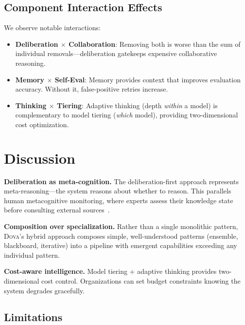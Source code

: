 \documentclass{article}
\theoremstyle{plain}
\theoremstyle{definition}
\newcommand{\dova}{\textsc{Dova}}
\begin{document}
\subsection{Component Interaction Effects}

We observe notable interactions:
\begin{itemize}
  \item \textbf{Deliberation $\times$ Collaboration}: Removing both is worse
    than the sum of individual removals---deliberation gatekeeps expensive
    collaborative reasoning.
  \item \textbf{Memory $\times$ Self-Eval}: Memory provides context that
    improves evaluation accuracy.  Without it, false-positive retries increase.
  \item \textbf{Thinking $\times$ Tiering}: Adaptive thinking (depth
    \emph{within} a model) is complementary to model tiering (\emph{which}
    model), providing two-dimensional cost optimization.
\end{itemize}

\section{Discussion}\label{sec:discussion}

\textbf{Deliberation as meta-cognition.}\quad
The deliberation-first approach represents meta-reasoning---the system reasons
about whether to reason.  This parallels human metacognitive monitoring, where
experts assess their knowledge state before consulting external
sources~\citep{shinn2023reflexion}.

\textbf{Composition over specialization.}\quad
Rather than a single monolithic pattern, \dova{}'s hybrid approach composes
simple, well-understood patterns (ensemble, blackboard, iterative) into a
pipeline with emergent capabilities exceeding any individual pattern.

\textbf{Cost-aware intelligence.}\quad
Model tiering + adaptive thinking provides two-dimensional cost control.
Organizations can set budget constraints knowing the system degrades
gracefully.

\subsection{Limitations}
\end{document}
